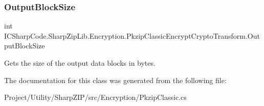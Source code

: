 \subsubsection{\texorpdfstring{Output\+Block\+Size}{OutputBlockSize}}
{\footnotesize\ttfamily int I\+C\+Sharp\+Code.\+Sharp\+Zip\+Lib.\+Encryption.\+Pkzip\+Classic\+Encrypt\+Crypto\+Transform.\+Output\+Block\+Size\hspace{0.3cm}{\ttfamily [get]}}



Gets the size of the output data blocks in bytes. 



The documentation for this class was generated from the following file\+:\begin{DoxyCompactItemize}
\item 
Project/\+Utility/\+Sharp\+Z\+I\+P/src/\+Encryption/Pkzip\+Classic.\+cs\end{DoxyCompactItemize}
